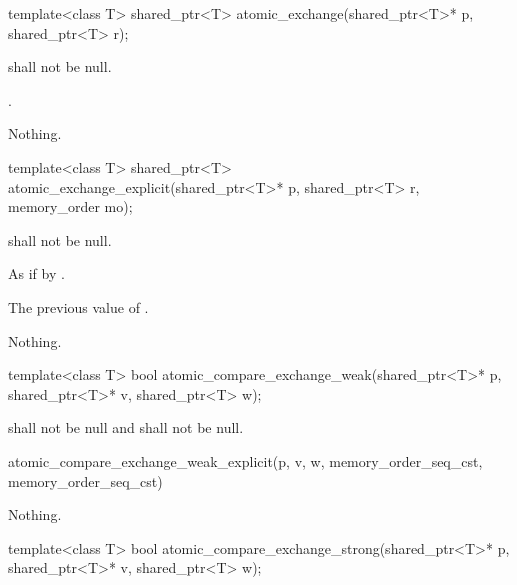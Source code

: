 %
\begin{itemdecl}
template<class T> shared_ptr<T> atomic_exchange(shared_ptr<T>* p, shared_ptr<T> r);
\end{itemdecl}

\begin{itemdescr}
\pnum
\requires {} shall not be null.

\pnum
\returns
{}.

\pnum
\throws
Nothing.
\end{itemdescr}

%
\begin{itemdecl}
template<class T>
  shared_ptr<T> atomic_exchange_explicit(shared_ptr<T>* p, shared_ptr<T> r, memory_order mo);
\end{itemdecl}

\begin{itemdescr}
\pnum
\requires {} shall not be null.

\pnum
\effects
As if by .

\pnum
\returns
The previous value of .

\pnum
\throws
Nothing.
\end{itemdescr}

%
\begin{itemdecl}
template<class T>
  bool atomic_compare_exchange_weak(shared_ptr<T>* p, shared_ptr<T>* v, shared_ptr<T> w);
\end{itemdecl}

\begin{itemdescr}
\pnum
\requires {} shall not be null and  shall not be null.

\pnum
\returns
\begin{codeblock}
atomic_compare_exchange_weak_explicit(p, v, w, memory_order_seq_cst, memory_order_seq_cst)
\end{codeblock}

\pnum
\throws
Nothing.
\end{itemdescr}

%
\begin{itemdecl}
template<class T>
  bool atomic_compare_exchange_strong(shared_ptr<T>* p, shared_ptr<T>* v, shared_ptr<T> w);
\end{itemdecl}

